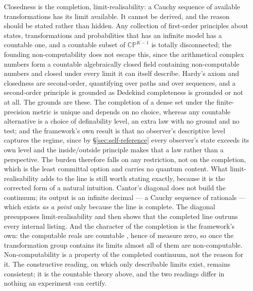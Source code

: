 Closedness is the completion, limit-realisability: a Cauchy sequence of available
transformations has its limit available. It cannot be derived, and the reason should be stated
rather than hidden. Any collection of first-order principles about states, transformations and
probabilities that has an infinite model has a countable one, and a countable subset of
$\mathbb{CP}^{K-1}$ is totally disconnected; the founding non-computability does not escape
this, since the arithmetical complex numbers form a countable algebraically closed field
containing non-computable numbers and closed under every limit it can itself describe. Hardy's
axiom and closedness are second-order, quantifying over paths and over sequences, and a
second-order principle is grounded as Dedekind completeness is grounded or not at all. The
grounds are these. The completion of a dense set under the finite-precision metric is unique and
depends on no choice, whereas any countable alternative is a choice of definability level, an
extra law with no ground and no test; and the framework's own result is that no observer's
descriptive level captures the regime, since by \S\ref{sec:self-reference} every observer's
state exceeds its own level and the inside/outside principle makes that a law rather than a
perspective. The burden therefore falls on any restriction, not on the completion, which is the
least committal option and carries no quantum content. What limit-realisability adds to the line
is still worth stating exactly, because it is the corrected form of a natural intuition.
Cantor's diagonal \autocite{cantor1891diagonal} does not build the continuum; its output is an
infinite decimal --- a Cauchy sequence of rationals --- which exists \emph{as a point} only
because the line is complete. The diagonal presupposes limit-realisability and then shows that
the completed line outruns every internal listing. And the character of the completion is the
framework's own: the computable reals are countable \autocite{Turing_1937}, hence of measure
zero, so once the transformation group contains its limits almost all of them are
non-computable. Non-computability is a property of the completed continuum, not the reason for
it. The constructive reading, on which only describable limits exist, remains consistent; it is
the countable theory above, and the two readings differ in nothing an experiment can certify.

